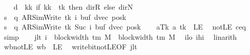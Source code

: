 \begin{isabellebody}
\ \ \isamarkupfalse%
\ {\isacharquery}{\kern0pt}d\ {\isacharequal}{\kern0pt}\ {\isachardoublequoteopen}{\isasymlambda}kk{\isachardot}{\kern0pt}\ if\ kk\ {\isacharequal}{\kern0pt}\ tk\ then\ dir{\isachardot}{\kern0pt}R\ else\ dir{\isachardot}{\kern0pt}N{\isachardoublequoteclose}\isanewline
\ \ \isamarkupfalse%
\ {\isacharquery}{\kern0pt}s\ {\isacharequal}{\kern0pt}\ {\isachardoublequoteopen}{\isacharparenleft}{\kern0pt}q{\isacharcomma}{\kern0pt}\ AR{\isacharunderscore}{\kern0pt}SimWrite{\isacharcomma}{\kern0pt}\ tk{\isacharcomma}{\kern0pt}\ i{\isacharcomma}{\kern0pt}\ buf{\isacharcomma}{\kern0pt}\ dvec{\isacharcomma}{\kern0pt}\ posk{\isacharparenright}{\kern0pt}{\isachardoublequoteclose}\isanewline
\ \ \isamarkupfalse%
\ {\isacharquery}{\kern0pt}s{\isacharprime}{\kern0pt}\ {\isacharequal}{\kern0pt}\ {\isachardoublequoteopen}{\isacharparenleft}{\kern0pt}q{\isacharcomma}{\kern0pt}\ AR{\isacharunderscore}{\kern0pt}SimWrite{\isacharcomma}{\kern0pt}\ tk{\isacharcomma}{\kern0pt}\ Suc\ i{\isacharcomma}{\kern0pt}\ buf{\isacharcomma}{\kern0pt}\ dvec{\isacharcomma}{\kern0pt}\ posk{\isacharparenright}{\kern0pt}{\isachardoublequoteclose}\isanewline
\ \ \isamarkupfalse%
\ aTk{\isacharcolon}{\kern0pt}\ {\isachardoublequoteopen}{\isacharquery}{\kern0pt}a\ tk\ {\isasymnoteq}\ LE{}{\isachardoublequoteclose}\ \isamarkupfalse%
\ notLE\ c{\isacharprime}{\kern0pt}{\isacharunderscore}{\kern0pt}eq\ \isamarkupfalse%
\ simp\isanewline
\ \ \isamarkupfalse%
\ jlt{\isacharcolon}{\kern0pt}\ {\isachardoublequoteopen}i\ {\isacharminus}{\kern0pt}\ block{\isacharunderscore}{\kern0pt}width\ {\isacharparenleft}{\kern0pt}{\isasymGamma}{\isacharunderscore}{\kern0pt}tm\ M{\isacharparenright}{\kern0pt}\ {\isacharless}{\kern0pt}\ block{\isacharunderscore}{\kern0pt}width\ {\isacharparenleft}{\kern0pt}{\isasymGamma}{\isacharunderscore}{\kern0pt}tm\ M{\isacharparenright}{\kern0pt}{\isachardoublequoteclose}\ \isamarkupfalse%
\ ilo\ ihi\ \isamarkupfalse%
\ linarith\isanewline
\ \ \isamarkupfalse%
\ wb{\isacharunderscore}{\kern0pt}not{\isacharunderscore}{\kern0pt}LE{\isacharcolon}{\kern0pt}\ {\isachardoublequoteopen}{\isacharquery}{\kern0pt}wb\ {\isasymnoteq}\ LE{}{\isachardoublequoteclose}\ \isamarkupfalse%
\ write{\isacharunderscore}{\kern0pt}bit{\isacharunderscore}{\kern0pt}not{\isacharunderscore}{\kern0pt}LE{}{\isacharbrackleft}{\kern0pt}OF\ jlt{\isacharbrackright}{\kern0pt}\ \isakeywordONE{{\isachardot}{\kern0pt}}\isamarkupfalse%

\end{isabellebody}
